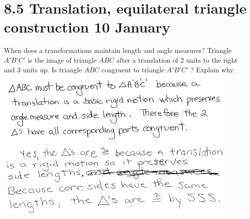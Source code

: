 \section{8.5 Translation, equilateral triangle construction \hfill 10 January}
\begin{frame}{When does a transformations maintain length and angle measures?}
  Triangle $A'B'C'$ is the image of triangle $ABC$ after a translation of 2 units to the right and 3 units up. Is triangle $ABC$ congruent to triangle $A'B'C'$ ? Explain why.\\[0.25cm]
  \pause \includegraphics[width=0.9\textwidth]{../graphics/isometry_JN2018-25-sol.png}\\
  \pause \includegraphics[width=0.9\textwidth]{../graphics/isometry_JN2018-25-sol2.png}
\end{frame}

